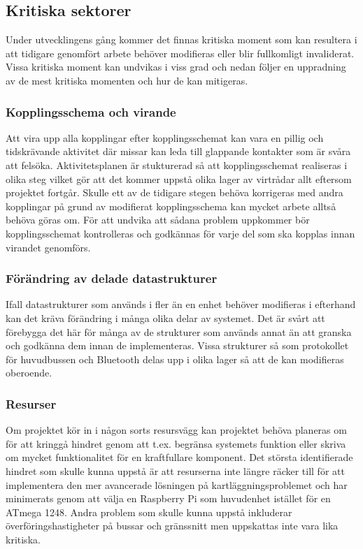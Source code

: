 \documentclass{article}
\begin{document}
\subsection{Kritiska sektorer}
Under utvecklingens gång kommer det finnas kritiska moment som kan resultera i att tidigare genomfört arbete behöver modifieras eller blir fullkomligt invaliderat. Vissa kritiska moment kan undvikas i viss grad och nedan följer en uppradning av de mest kritiska momenten och hur de kan mitigeras.

\subsubsection{Kopplingsschema och virande}
Att vira upp alla kopplingar efter kopplingsschemat kan vara en pillig och tidskrävande aktivitet där missar kan leda till glappande kontakter som är svåra att felsöka. Aktivitetsplanen är stukturerad så att kopplingsschemat realiseras i olika steg vilket gör att det kommer uppstå olika lager av virtrådar allt eftersom projektet fortgår. Skulle ett av de tidigare stegen behöva korrigeras med andra kopplingar på grund av modifierat kopplingsschema kan mycket arbete alltså behöva göras om. För att undvika att sådana problem uppkommer bör kopplingsschemat kontrolleras och godkännas för varje del som ska kopplas innan virandet genomförs.

\subsubsection{Förändring av delade datastrukturer}
Ifall datastrukturer som används i fler än en enhet behöver modifieras i efterhand kan det kräva förändring i många olika delar av systemet. Det är svårt att förebygga det här för många av de strukturer som används annat än att granska och godkänna dem innan de implementeras. Vissa strukturer så som protokollet för huvudbussen och Bluetooth delas upp i olika lager så att de kan modifieras oberoende.

\subsubsection{Resurser}
Om projektet kör in i någon sorts resursvägg kan projektet behöva planeras om för att kringgå hindret genom att t.ex. begränsa systemets funktion eller skriva om mycket funktionalitet för en kraftfullare komponent. Det största identifierade hindret som skulle kunna uppstå är att resurserna inte längre räcker till för att implementera den mer avancerade lösningen på kartläggningsproblemet och har minimerats genom att välja en Raspberry Pi som huvudenhet istället för en ATmega 1248. Andra problem som skulle kunna uppstå inkluderar överföringshastigheter på bussar och gränssnitt men uppskattas inte vara lika kritiska. 
\end{document}
